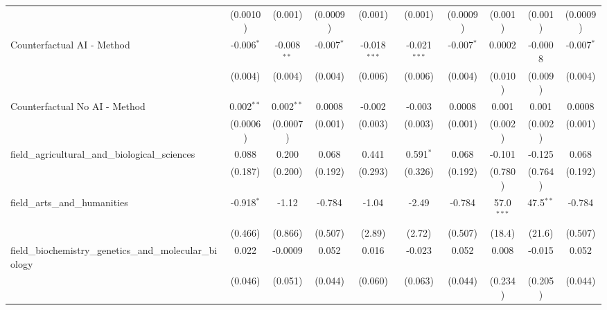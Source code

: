 \begin{tabular}{lccccccccc}
                                                               & (0.0010)       & (0.001)        & (0.0009)      & (0.001)        & (0.001)        & (0.0009)      & (0.001)      & (0.001)     & (0.0009)\\   
   Counterfactual AI - Method                                  & -0.006$^{*}$   & -0.008$^{**}$  & -0.007$^{*}$  & -0.018$^{***}$ & -0.021$^{***}$ & -0.007$^{*}$  & 0.0002       & -0.0008     & -0.007$^{*}$\\   
                                                               & (0.004)        & (0.004)        & (0.004)       & (0.006)        & (0.006)        & (0.004)       & (0.010)      & (0.009)     & (0.004)\\   
   Counterfactual No AI - Method                               & 0.002$^{**}$   & 0.002$^{**}$   & 0.0008        & -0.002         & -0.003         & 0.0008        & 0.001        & 0.001       & 0.0008\\   
                                                               & (0.0006)       & (0.0007)       & (0.001)       & (0.003)        & (0.003)        & (0.001)       & (0.002)      & (0.002)     & (0.001)\\   
   field\_agricultural\_and\_biological\_sciences              & 0.088          & 0.200          & 0.068         & 0.441          & 0.591$^{*}$    & 0.068         & -0.101       & -0.125      & 0.068\\   
                                                               & (0.187)        & (0.200)        & (0.192)       & (0.293)        & (0.326)        & (0.192)       & (0.780)      & (0.764)     & (0.192)\\   
   field\_arts\_and\_humanities                                & -0.918$^{*}$   & -1.12          & -0.784        & -1.04          & -2.49          & -0.784        & 57.0$^{***}$ & 47.5$^{**}$ & -0.784\\   
                                                               & (0.466)        & (0.866)        & (0.507)       & (2.89)         & (2.72)         & (0.507)       & (18.4)       & (21.6)      & (0.507)\\   
   field\_biochemistry\_genetics\_and\_molecular\_biology      & 0.022          & -0.0009        & 0.052         & 0.016          & -0.023         & 0.052         & 0.008        & -0.015      & 0.052\\   
                                                               & (0.046)        & (0.051)        & (0.044)       & (0.060)        & (0.063)        & (0.044)       & (0.234)      & (0.205)     & (0.044)\\   

\end{tabular}
